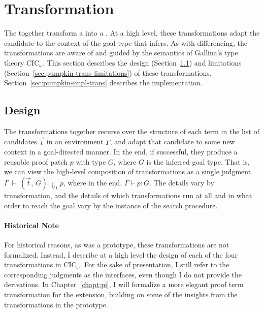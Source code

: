 \section{Transformation}
\label{sec:pumpkin-trans}

The  together transform a  into a .
At a high level, these transformations adapt the candidate to the context of the goal type that \sysname infers.
As with differencing, the transformations are aware of and guided by the semantics of Gallina's type theory CIC$_{\omega}$.
This section describes the design (Section~\ref{sec:pumpkin-trans-design}) and limitations (Section~\ref{sec:pumpkin-trans-limitations}) of these transformations.
Section~\ref{sec:pumpkin-impl-trans} describes the implementation.


\subsection{Design}
\label{sec:pumpkin-trans-design}

The transformations together recurse over the structure of each term in the list of candidates $\vec{t}$ in an environment $\Gamma$,
and adapt that candidate to some new context in a goal-directed manner.
In the end, if successful, they produce a reusable proof patch $p$ with type $G$, where $G$ is the inferred goal type.
That is, we can view the high-level composition of transformations as a single judgment
$\Gamma\ \vdash\ (\vec{t},\ G)\ \Downarrow_{t} p$, where in the end, $\Gamma \vdash p : G$. 
The details vary by transformation,
and the details of which transformations run at all and in what order to reach the goal vary by the instance
of the search procedure.

\paragraph{Historical Note}
For historical reasons, as \sysname was a prototype, these transformations are not formalized. %
Instead, I describe at a high level the design of each of the four transformations in CIC${_\omega}$.
For the sake of presentation, I still refer to the corresponding judgments as the interfaces, even though I do not provide the derivations.
In Chapter~\ref{chapt:pi}, I will formalize a more elegant proof term transformation for the \toolnamec extension,
building on some of the insights from the transformations in the \sysname prototype.

